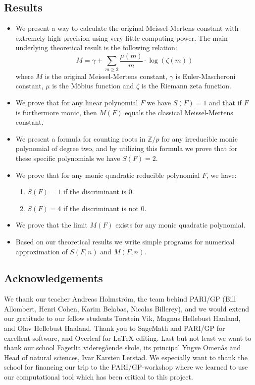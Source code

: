 \documentclass{article}
\theoremstyle{definition}
\theoremstyle{remark}
\begin{document}
\subsection{Results}
\begin{itemize}
\item We present a way to calculate the original Meissel-Mertens constant with extremely high precision using very little computing power. The main underlying theoretical result is the following relation:
$$M = \gamma + \sum_{m\geq 2}\frac{\mu(m)}{m} \cdot \log(\zeta(m))$$
where $M$ is the original Meissel-Mertens constant, $\gamma$ is Euler-Mascheroni constant, $\mu$ is the Möbius function and $\zeta$ is the Riemann zeta function.
\item We prove that for any linear polynomial $F$ we have $S(F)=1$ and that if $F$ is furthermore monic, then $M(F)$ equals the classical Meissel-Mertens constant.
\item We present a formula for counting roots in $\mathbb{Z}/p$ for any irreducible monic polynomial of degree two, and by utilizing this formula we prove that for these specific polynomials we have $S(F)=2$.
\item We prove that for any monic quadratic reducible polynomial $F$, we have:
\begin{enumerate}
\item  $S(F)=1$ if the discriminant is $0$.
\item $S(F)=4$ if the discriminant is not $0$.
\end{enumerate}
\item We prove that the limit $M(F)$ exists for any monic quadratic polynomial.
\item Based on our theoretical results we write simple programs for numerical approximation of $S(F,n)$ and $M(F,n)$.
\end{itemize}


\subsection{Acknowledgements}
We thank our teacher Andreas Holmström, the team behind PARI/GP (Bill Allombert, Henri Cohen, Karim Belabas, Nicolas Billerey), and we would extend our gratitude to our fellow students Torstein Vik, Magnus Hellebust Haaland, and Olav Hellebust Haaland. Thank you to SageMath and PARI/GP for excellent software, and Overleaf for LaTeX editing. Last but not least we want to thank our school Fagerlia videregående skole, its principal Yngve Omenås and Head of natural sciences, Ivar Karsten Lerstad. We especially want to thank the school for financing our trip to the PARI/GP-workshop where we learned to use our computational tool which has been critical to this project.
\newpage
\end{document}
